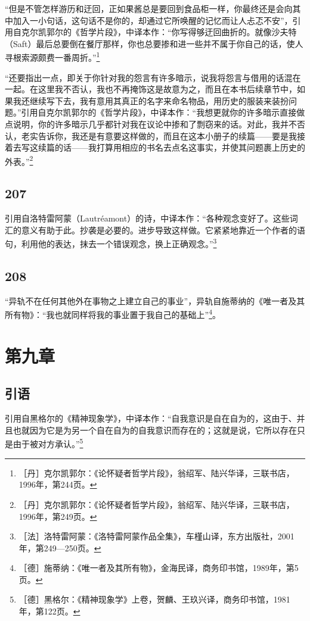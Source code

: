 \documentclass[fontset=fandol, a4paper, 12pt, openright]{ctexbook}
\begin{document}
“但是不管怎样游历和迂回，正如果酱总是要回到食品柜一样，你最终还是会向其中加入一小句话，这句话不是你的，却通过它所唤醒的记忆而让人忐忑不安”，引用自克尔凯郭尔的《哲学片段》，中译本作：“你写得够迂回曲折的。就像沙夫特（Saft）最后总要倒在餐厅那样，你也总要掺和进一些并不属于你自己的话，使人寻根索源颇费一番周折。”\footnote{［丹］克尔凯郭尔：《论怀疑者哲学片段》，翁绍军、陆兴华译，三联书店，1996年，第244页。}

“还要指出一点，即关于你针对我的怨言有许多暗示，说我将怨言与借用的话混在一起。在这里我不否认，我也不再掩饰这是故意为之，而且在本书后续章节中，如果我还继续写下去，我有意用其真正的名字来命名物品，用历史的服装来装扮问题。”引用自克尔凯郭尔的《哲学片段》，中译本作：“我想更就你的许多暗示直接做点说明，你的许多暗示几乎都针对我在议论中掺和了剽窃来的话。对此，我并不否认，老实告诉你，我还是有意要这样做的，而且在这本小册子的续篇——要是我接着去写这续篇的话——我打算用相应的书名去点名这事实，并使其问题裹上历史的外表。”\footnote{［丹］克尔凯郭尔：《论怀疑者哲学片段》，翁绍军、陆兴华译，三联书店，1996年，第249页。}

\subsection*{207}
引用自洛特雷阿蒙（Lautréamont）的诗，中译本作：“各种观念变好了。这些词汇的意义有助于此。抄袭是必要的。进步导致这样做。它紧紧地靠近一个作者的语句，利用他的表达，抹去一个错误观念，换上正确观念。”\footnote{［法］洛特雷阿蒙：《洛特雷阿蒙作品全集》，车槿山译，东方出版社，2001年，第249—250页。}

\subsection*{208}
“异轨不在任何其他外在事物之上建立自己的事业”，异轨自施蒂纳的《唯一者及其所有物》：“我也就同样将我的事业置于我自己的基础上”\footnote{［德］施蒂纳：《唯一者及其所有物》，金海民译，商务印书馆，1989年，第5页。}。

\section*{第九章}

\subsection*{引语}
引用自黑格尔的《精神现象学》，中译本作：“自我意识是自在自为的，这由于、并且也就因为它是为另一个自在自为的自我意识而存在的；这就是说，它所以存在只是由于被对方承认。”\footnote{［德］黑格尔：《精神现象学》上卷，贺麟、王玖兴译，商务印书馆，1981年，第122页。}
\end{document}
